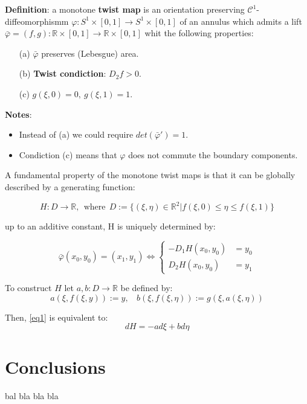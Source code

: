 \documentclass{article}
\begin{document}
\noindent \textbf{Definition}: \label{def-TwistMap} a monotone \textbf{twist map} is an orientation preserving $\mathcal{C}^{1}$-diffeomorphismm $\varphi: S^1 \times [0, 1] \longrightarrow S^{1} \times [0, 1]$ of an annulus which admits a lift $\bar{\varphi} = (f, g): \mathbb{R} \times [0, 1] \longrightarrow \mathbb{R} \times [0, 1]$ whit the following properties:
\begin{itemize}
	\item [(a)]\label{def-TwistMap_a} $\bar{\varphi}$ preserves (Lebesgue) area.
	\item [(b)]\label{def-TwistMap_b}\textbf{Twist condiction}: $D_{2} f > 0$.
	\item [(c)] \label{def-TwistMap_c}$g(\xi, 0) = 0, \ g(\xi, 1) = 1$.
\end{itemize}

\noindent \textbf{Notes}:
	\begin{itemize}
		\item Instead of (a) we could require $det( \bar{\varphi}' ) = 1$.
		\item Condiction (c) means that $\varphi$ does not commute the boundary components.
	\end{itemize}
		
		

A fundamental property of the monotone twist maps is that it can be globally described by a generating function:

$$
	H: D \rightarrow \mathbb{R}, \ \ \text{where} \ \ D := \{  (\xi, \eta) \in \mathbb{R}^{2} | f(\xi, 0) \leq \eta \leq f(\xi, 1) 
	\}
$$

up to an additive constant, H is uniquely determined by:

\begin{equation}\label{eq1}
	\bar{\varphi} (x_0, y_0) = (x_1, y_1) \Leftrightarrow
	  \begin{cases} 
     	    - D_{1} H  (x_0, y_0) &= y_0  \\
      		D_{2} H  (x_0, y_0) &= y_1 
      \end{cases}
\end{equation}

\noindent To construct $H$ let $a, b: D \rightarrow \mathbb{R}$ be defined by:
$$
	a ( \xi, f(\xi, y)) := y,  \ \ \ \	b( \xi, f(\xi, \eta)) := g(\xi, a( \xi, \eta))
$$

Then, \ref{eq1} is equivalent to:
$$
	dH = - a d \xi + b d \eta
$$
		
\section{Conclusions}
		
\cite{R1}





\newpage		
\begin{thebibliography}{X}
 bal bla bla bla
\end{thebibliography}
		
		
		
		
		
		
		
		
		
		
		
		

	
	
\end{document}
